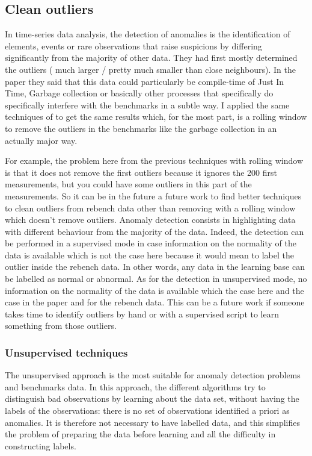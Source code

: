 \documentclass{article}
\begin{document}
\subsection{Clean outliers}

In time-series data analysis, the detection of anomalies is the identification of elements, events or rare observations that raise suspicions by differing significantly from the majority of other data. They had first mostly determined the outliers ( much larger / pretty much smaller than close neighbours). In the paper \citep{barrett2017virtual} they said that this data could particularly be compile-time of Just In Time, Garbage collection or basically other processes that specifically do specifically interfere with the benchmarks in a subtle way. I applied the same techniques of \citep{barrett2017virtual} to get the same results which, for the most part, is a rolling window to remove the outliers in the benchmarks like the garbage collection in an actually major way.

For example, the problem here from the previous techniques with rolling window is that it does not remove the first outliers because it ignores the 200 first measurements, but you could have some outliers in this part of the measurements. So it can be in the future a future work to find better techniques to clean outliers from rebench data other than removing with a rolling window which doesn't remove outliers.
Anomaly detection consists in highlighting data with different behaviour from the majority of the data. 
Indeed, the detection can be performed in a supervised mode in case information on the normality of the data is available which is not the case here because it would mean to label the outlier inside the rebench data. In other words, any data in the learning base can be labelled as normal or abnormal.
As for the detection in unsupervised mode, no information on the normality of the data is available which the case here and the case in the \citep{barrett2017virtual} paper and for the rebench data. This can be a future work if someone takes time to identify outliers by hand or with a supervised script to learn something from those outliers.

\subsubsection{Unsupervised techniques}
The unsupervised approach is the most suitable for anomaly detection problems and benchmarks data. In this approach, the different algorithms try to distinguish bad observations by learning about the data set, without having the labels of the observations: there is no set of observations identified a priori as anomalies. It is therefore not necessary to have labelled data, and this simplifies the problem of preparing the data before learning and all the difficulty in constructing labels.
\end{document}
